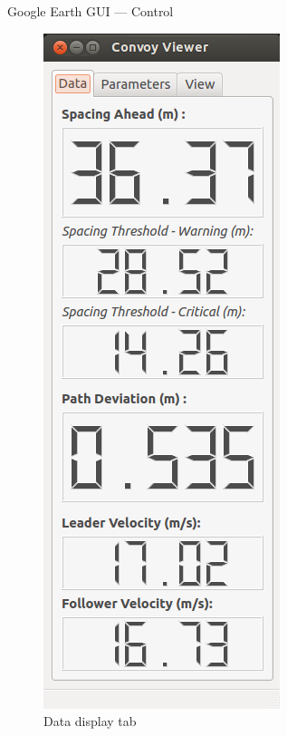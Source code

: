 \documentclass{beamer}
\begin{document}
    \begin{frame}{Google Earth GUI --- Control}
      \begin{figure}[!htb] %
         \centering
          \includegraphics[height=0.85\textheight]{../graphics/earth_data.png}
          \caption{\tiny Data display tab}
        \endminipage\hfill
         \centering

\end{figure}
\end{frame}
\end{document}
